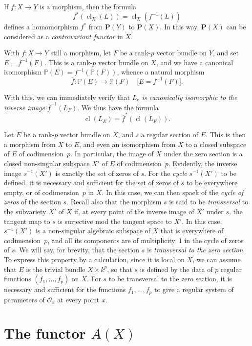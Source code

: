 \documentclass{article}
\theoremstyle{plain}
\theoremstyle{definition}
\newcommand{\sh}{\mathscr}
\newcommand{\PP}{\mathbf{P}}
\DeclareMathOperator{\cl}{cl}
\begin{document}
If $f\colon X\to Y$ is a morphism, then the formula
\[
  f^*(\cl_X(L)) = \cl_X(f^{-1}(L))
\]
defines a homomorphism $f^*$ from $\PP(Y)$ to $\PP(X)$.
In this way, $\PP(X)$ can be considered as a \emph{contravariant functor} in $X$.

With $f\colon X\to Y$ still a morphism, let $F$ be a rank-$p$ vector bundle on $Y$, and set $E=f^{-1}(F)$.
This is a rank-$p$ vector bundle on $X$, and we have a canonical isomorphism $\mathbb{P}(E)=f^{-1}(\mathbb{P}(F))$, whence a natural morphism
\[
  \overline{f}\colon \mathbb{P}(E) \to \mathbb{P}(F)
  \quad\mbox{[$E=f^{-1}(F)$].}
\]

With this, we can immediately verify that \emph{$L_e$ is canonically isomorphic to the inverse image $\overline{f}^{-1}(L_F)$}.
We thus have the formula
\[
  \cl(L_E) = \overline{f}^*(\cl(L_F)).
\]

Let $E$ be a rank-$p$ vector bundle on $X$, and $s$ a regular section of $E$.
This is then a morphism from $X$ to $E$, and even an isomorphism from $X$ to a closed subspace of $E$ of codimension~$p$.
In particular, the image of $X$ under the zero section is a closed non-singular subspace $X'$ of $E$ of codimension~$p$.
Evidently, the inverse image $s^{-1}(X')$ is exactly the set of zeros of $s$.
For the \emph{cycle} $s^{-1}(X')$ to be defined, it is necessary and sufficient for the set of zeros of $s$ to be everywhere empty, or of codimension~$p$ in $X$.
In this case, we can then spaek of the \emph{cycle of zeros} of the section $s$.
Recall also that the morphism $s$ is said to be \emph{transversal} to the subvariety $X'$ of $X$ if, at every point of the inverse image of $X'$ under $s$, the tangent map to $s$ is surjective mod the tangent space to $X'$.
In this case, $s^{-1}(X')$ is a non-singular algebraic subspace of $X$ that is everywhere of codimension~$p$, and all its components are of multiplicity~$1$ in the cycle of zeros of $s$.
We will say, for brevity, that the section $s$ is \emph{transversal to the zero section}.
To express this property by a calculation, since it is local on $X$, we can assume that $E$ is the trivial bundle $X\times k^p$, so that $s$ is defined by the data of $p$ regular functions $(f_1,\ldots,f_p)$ on $X$.
For $s$ to be transversal to the zero section, it is necessary and sufficient for the functions $f_1,\ldots,f_p$ to give a regular system of parameters of $\sh{O}_x$ at every point $x$.


\section{The functor $A(X)$}
\label{section2}
\end{document}
